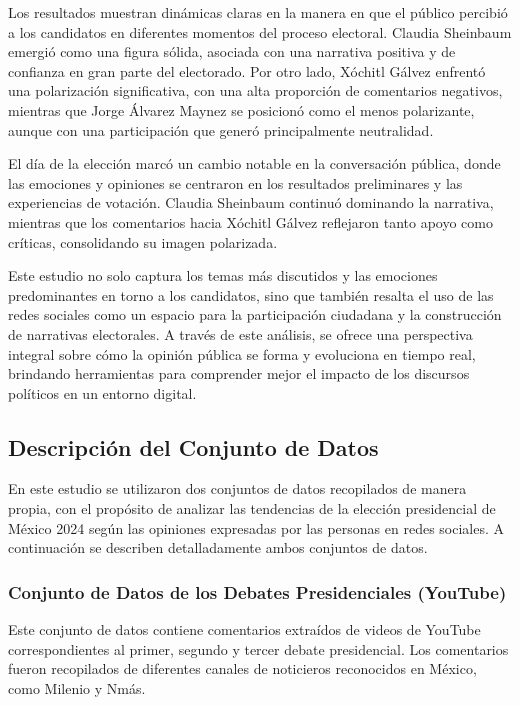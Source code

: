 \documentclass[10pt, a4paper]{article}
\begin{document}
	Los resultados muestran dinámicas claras en la manera en que el público percibió a los candidatos en diferentes momentos del proceso electoral. Claudia Sheinbaum emergió como una figura sólida, asociada con una narrativa positiva y de confianza en gran parte del electorado. Por otro lado, Xóchitl Gálvez enfrentó una polarización significativa, con una alta proporción de comentarios negativos, mientras que Jorge Álvarez Maynez se posicionó como el menos polarizante, aunque con una participación que generó principalmente neutralidad.
	
	El día de la elección marcó un cambio notable en la conversación pública, donde las emociones y opiniones se centraron en los resultados preliminares y las experiencias de votación. Claudia Sheinbaum continuó dominando la narrativa, mientras que los comentarios hacia Xóchitl Gálvez reflejaron tanto apoyo como críticas, consolidando su imagen polarizada.
	
	Este estudio no solo captura los temas más discutidos y las emociones predominantes en torno a los candidatos, sino que también resalta el uso de las redes sociales como un espacio para la participación ciudadana y la construcción de narrativas electorales. A través de este análisis, se ofrece una perspectiva integral sobre cómo la opinión pública se forma y evoluciona en tiempo real, brindando herramientas para comprender mejor el impacto de los discursos políticos en un entorno digital.
	
	
	\subsection{Descripción del Conjunto de Datos}
	
	En este estudio se utilizaron dos conjuntos de datos recopilados de manera propia, con el propósito de analizar las tendencias de la elección presidencial de México 2024 según las opiniones expresadas por las personas en redes sociales. A continuación se describen detalladamente ambos conjuntos de datos.
	
	\subsubsection{Conjunto de Datos de los Debates Presidenciales (YouTube)}
	
	Este conjunto de datos contiene comentarios extraídos de videos de YouTube correspondientes al primer, segundo y tercer debate presidencial. Los comentarios fueron recopilados de diferentes canales de noticieros reconocidos en México, como Milenio y Nmás.
	
\end{document}
